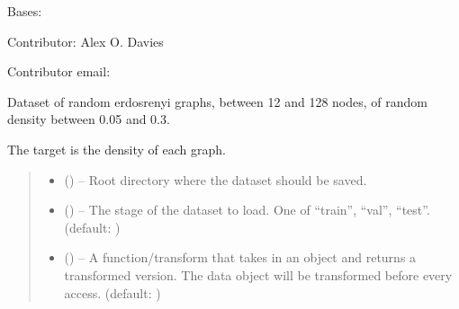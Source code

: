 \documentclass[letterpaper,10pt,english]{sphinxhowto}
\begin{document}
\begin{fulllineitems}
\label{\detokenize{datasets/synthetic:datasets.synthetic.RandomDataset}}
\pysigstartsignatures
{}
\pysigstopsignatures
\sphinxAtStartPar
Bases: 

\sphinxAtStartPar
Contributor: Alex O. Davies

\sphinxAtStartPar
Contributor email: 

\sphinxAtStartPar
Dataset of random erdos\sphinxhyphen{}renyi graphs, between 12 and 128 nodes, of random density between 0.05 and 0.3.

\sphinxAtStartPar
The target is the density of each graph.
\begin{quote}\begin{description}
\begin{itemize}
\item {} 
\sphinxAtStartPar
{} () – Root directory where the dataset should be saved.

\item {} 
\sphinxAtStartPar
{} () – The stage of the dataset to load. One of “train”, “val”, “test”. (default: )

\item {} 
\sphinxAtStartPar
{} (\sphinxstyleliteralemphasis{\sphinxupquote{, }}) – A function/transform that takes in an  object and returns a transformed version. The data object will be transformed before every access. (default: )


\end{itemize}
\end{description}
\end{quote}
\end{fulllineitems}
\end{document}
